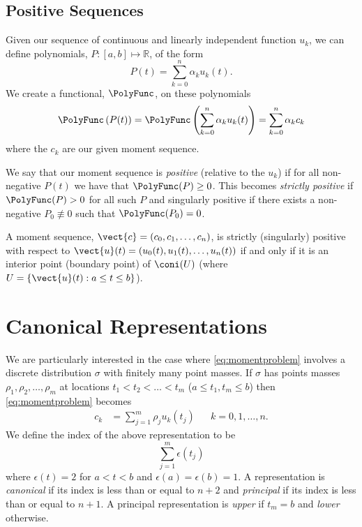 \subsection{Positive Sequences}
Given our sequence of continuous and linearly independent function $u_k$, we can define polynomials, $P: [a,b] \mapsto \mathbb{R}$, of the form
\begin{equation}
	P(t) = \sum_{k = 0}^n \alpha_k u_k(t).
\end{equation}
We create a functional, $\PolyFunc$, on these polynomials
\begin{equation}
	\PolyFunc \left(P(t)\right) = \PolyFunc \left(\sum_{k = 0}^n \alpha_k u_k(t)\right) = \sum_{k=0}^n \alpha_k c_k
\end{equation}
where the $c_k$ are our given moment sequence. 

We say that our moment sequence is \emph{positive} (relative to the $u_k$) if for all non-negative $P(t)$ we have that $\PolyFunc(P) \geq 0$. This becomes \emph{strictly positive} if $\PolyFunc(P) > 0$ for all such $P$ and singularly positive if there exists a non-negative $P_0 \not\equiv 0$ such that $\PolyFunc(P_0) = 0$.
\begin{theorem}
	A moment sequence, $\vect{c} = (c_0,c_1,\dots,c_n)$, is strictly (singularly) positive with respect to $\vect{u}(t) = (u_0(t),u_1(t),\dots,u_n(t))$ if and only if it is an interior point (boundary point) of $\coni(U)$ (where $U = \left\{ \vect{u}(t): a\leq t\leq b\right\}$).
\end{theorem}

\section{Canonical Representations}
We are particularly interested in the case where \eqref{eq:momentproblem} involves a discrete distribution $\sigma$ with finitely many point masses. If $\sigma$ has points masses $\rho_1, \rho_2, \dots, \rho_m$ at locations $t_1 < t_2 <\dots < t_m$ ($a \leq t_1, t_m \leq b$) then \eqref{eq:momentproblem} becomes
\begin{align}
	c_k &= \sum_{j=1}^m \rho_j u_k(t_j) && k = 0,1,\dots,n.
\end{align}
We define the index of the above representation to be
\begin{equation}
	\sum_{j = 1}^m \epsilon(t_j)
\end{equation}
where $\epsilon(t) = 2$ for $a < t<b$ and $\epsilon(a) = \epsilon(b) = 1$. A representation is \emph{canonical} if its index is less than or equal to $n+2$ and \emph{principal} if its index is less than or equal to $n+1$. A principal representation is \emph{upper} if $t_m = b$ and \emph{lower} otherwise.

